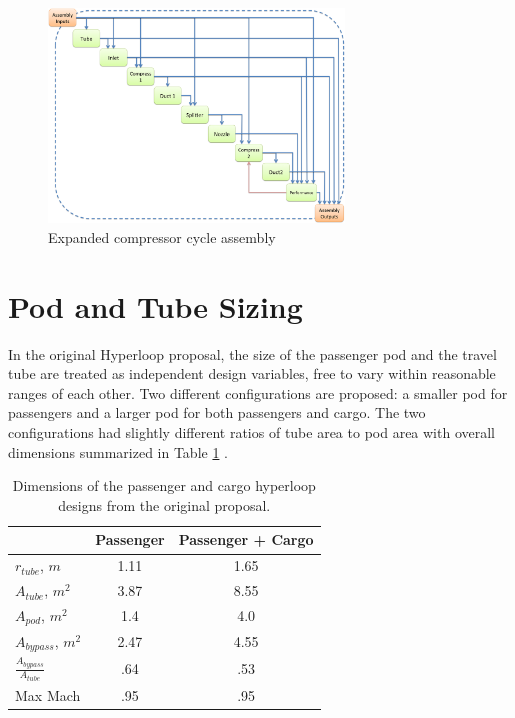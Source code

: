 \documentclass[heading.tex]{subfiles}
\begin{document}
\begin{figure}[H]
\centering
\includegraphics[width=0.7\textwidth]{images/compAssembly.png}
\caption{Expanded compressor cycle assembly}
\label{f:compressorXDSM}
\end{figure}


\section{Pod and Tube Sizing}
\label{s:sizing}

In the original Hyperloop proposal, the size of the passenger pod and the travel tube are treated as independent design variables, 
free to vary within reasonable ranges of each other. Two different configurations are proposed:
a smaller pod for passengers and a larger pod for both passengers and cargo.
The two configurations had slightly different ratios of tube area to pod area with overall dimensions summarized 
in Table \ref{t:hyperbase} . 

\begin{table}
  \centering
  \caption{Dimensions of the passenger and cargo hyperloop designs from the original proposal. }
  \label{t:hyperbase}
  \begin{tabular}{l c c}
    \hline
                                  &  Passenger       & Passenger + Cargo \\ \hline
    $r_{tube}$, $m$              &        1.11      &     1.65  \\
    $A_{tube}$, $m^2$           &        3.87      &     8.55  \\
    $A_{pod}$, $m^2$             &        1.4       &     4.0   \\ 
    $A_{bypass}$, $m^2$          &        2.47      &     4.55  \\ 
    $\frac{A_{bypass}}{A_{tube}}$ &        .64       &     .53   \\
    Max Mach                      &        .95       &     .95   \\
    \hline
  \end{tabular}
\end{table}
\end{document}
